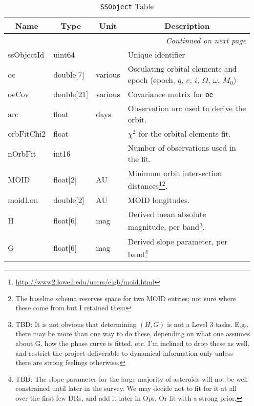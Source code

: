 \documentclass[12pt]{article}
\newcommand{\code}[1]{\texttt{#1}}
\newcommand{\SSObject}{\code{SSObject}\xspace}
\begin{document}
\begin{center}
\begin{longtable}{p{3cm}p{2cm}p{2cm}p{5cm}}
\caption[\SSObject Table]{\SSObject Table} \\

\hline \multicolumn{1}{c}{\bf Name} & \multicolumn{1}{c}{\bf Type} & \multicolumn{1}{c}{\bf Unit} & \multicolumn{1}{c}{\bf Description} \\ \hline
\endhead

\hline \multicolumn{4}{r}{{\em Continued on next page}} \\
\endfoot

\hline\hline
\endlastfoot

ssObjectId & uint64 & ~ & Unique identifier \\ 

oe & double[7] & various & Osculating orbital elements and epoch (epoch, $q$, $e$, $i$, $\Omega$, $\omega$, $M_0$) \\

oeCov & double[21] & various & Covariance matrix for \texttt{oe} \\

arc & float & days & Observation arc used to derive the orbit. \\

orbFitChi2 & float & ~ & $\chi^2$ for the orbital elements fit. \\

nOrbFit & int16 & ~ & Number of observations used in the fit. \\

MOID & float[2] & AU & Minimum orbit intersection distances\footnote{\url{http://www2.lowell.edu/users/elgb/moid.html}}\footnote{The baseline schema reserves space for two MOID entries; not sure where these come from but I retained them}. \\

moidLon & double[2] & AU & MOID longitudes. \\

H & float[6] & mag & Derived mean absolute magnitude, per band\footnote{TBD: It is not obvious that determining $(H,G)$ is not a Level 3 tasks. E.g., there may be more than one way to do these, depending on what one assumes about G, how the phase curve is fitted, etc. I'm inclined to drop these as well, and restrict the project deliverable to dynamical information only unless there are strong feelings otherwise.}. \\

G & float[6] & mag & Derived slope parameter, per band\footnote{TBD: The slope parameter for the large majority of asteroids will not be well constrained until later in the survey. We may decide not to fit for it at all over the first few DRs, and add it later in Ops. Or fit with a strong prior.} \\


\end{longtable}
\end{center}
\end{document}
